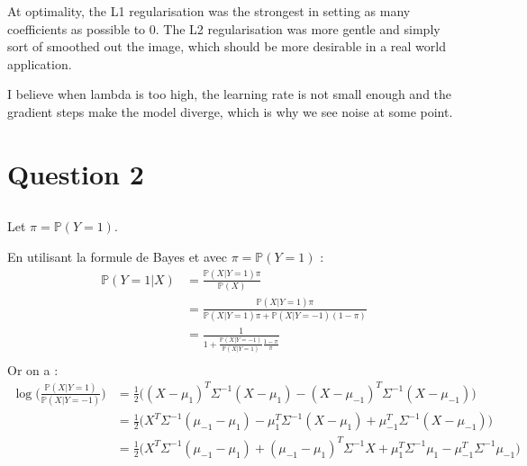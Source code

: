 \documentclass{article}
\newcommand{\pr}{\mathbb{P}}
\begin{document}
At optimality, the L1 regularisation was the strongest in setting as many coefficients as possible to 0. The L2 regularisation was more gentle and simply sort of smoothed out the image, which should be more desirable in a real world application.

I believe when lambda is too high, the learning rate is not small enough and the gradient steps make the model diverge, which is why we see noise at some point.




\section{Question 2}

\subsection{}

Let $\pi = \mathbb{P}(Y = 1)$.

En utilisant la formule de Bayes et avec $\pi=\pr(Y=1)$ :
\begin{align*}
\pr(Y=1|X) &= \frac{\pr(X|Y=1)\pi}{\pr(X)}\\
&= \frac{\pr(X|Y=1)\pi}{\pr(X|Y=1)\pi + \pr(X|Y=-1)(1-\pi)}\\
&= \frac 1 {1+\frac{\pr(X|Y=-1)}{\pr(X|Y=1)}\frac{1-\pi}{\pi}}\\
\end{align*}
Or on a :
\begin{align*}
\log\bigg(\frac{\pr(X|Y=1)}{\pr(X|Y=-1)}\bigg) &= \frac 1 2 \big((X-\mu_1)^T\Sigma^{-1}(X-\mu_1) - (X-\mu_{-1})^T\Sigma^{-1}(X-\mu_{-1}) \big)\\
&= \frac 1 2 \big( X^T\Sigma^{-1}(\mu_{-1}-\mu_{1}) - \mu_1^T\Sigma^{-1}(X-\mu_1) + \mu_{-1}^T\Sigma^{-1}(X-\mu_{-1})\big)\\
&= \frac 1 2 \big(X^T\Sigma^{-1}(\mu_{-1} - \mu_1) + (\mu_{-1} - \mu_1)^T\Sigma^{-1}X + \mu_1^T\Sigma^{-1}\mu_1 - \mu_{-1}^T\Sigma^{-1}\mu_{-1}\big)\\
\end{align*}
\end{document}

